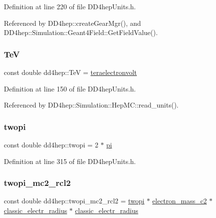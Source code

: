 Definition at line 220 of file D\+D4hep\+Units.\+h.



Referenced by D\+D4hep\+::create\+Gear\+Mgr(), and D\+D4hep\+::\+Simulation\+::\+Geant4\+Field\+::\+Get\+Field\+Value().

\hypertarget{namespacedd4hep_a7c925bf28d6b294f8f120a69deb6fe02}{}\label{namespacedd4hep_a7c925bf28d6b294f8f120a69deb6fe02} 
\subsubsection{\texorpdfstring{TeV}{TeV}}
{\footnotesize\ttfamily const double dd4hep\+::\+TeV = \hyperlink{namespacedd4hep_ac482cce1ba221816734b1a3384f958d9}{teraelectronvolt}\hspace{0.3cm}{\ttfamily [static]}}



Definition at line 150 of file D\+D4hep\+Units.\+h.



Referenced by D\+D4hep\+::\+Simulation\+::\+Hep\+M\+C\+::read\+\_\+units().

\hypertarget{namespacedd4hep_ae89c0c70c74b5fd0c1972865846822d7}{}\label{namespacedd4hep_ae89c0c70c74b5fd0c1972865846822d7} 
\subsubsection{\texorpdfstring{twopi}{twopi}}
{\footnotesize\ttfamily const double dd4hep\+::twopi = 2 $\ast$ \hyperlink{namespacedd4hep_ae71f82066d68af053eb8f60d0e13d3af}{pi}\hspace{0.3cm}{\ttfamily [static]}}



Definition at line 315 of file D\+D4hep\+Units.\+h.

\hypertarget{namespacedd4hep_a5db1b84c8dc851581b5ba57b661f575f}{}\label{namespacedd4hep_a5db1b84c8dc851581b5ba57b661f575f} 
\subsubsection{\texorpdfstring{twopi\+\_\+mc2\+\_\+rcl2}{twopi\_mc2\_rcl2}}
{\footnotesize\ttfamily const double dd4hep\+::twopi\+\_\+mc2\+\_\+rcl2 = \hyperlink{namespacedd4hep_ae89c0c70c74b5fd0c1972865846822d7}{twopi} $\ast$ \hyperlink{namespacedd4hep_a90fb8853ce4da9b13bd108593b2d154d}{electron\+\_\+mass\+\_\+c2} $\ast$ \hyperlink{namespacedd4hep_ab829ac901c489f46802352c5e2b3c165}{classic\+\_\+electr\+\_\+radius} $\ast$ \hyperlink{namespacedd4hep_ab829ac901c489f46802352c5e2b3c165}{classic\+\_\+electr\+\_\+radius}\hspace{0.3cm}{\ttfamily [static]}}



